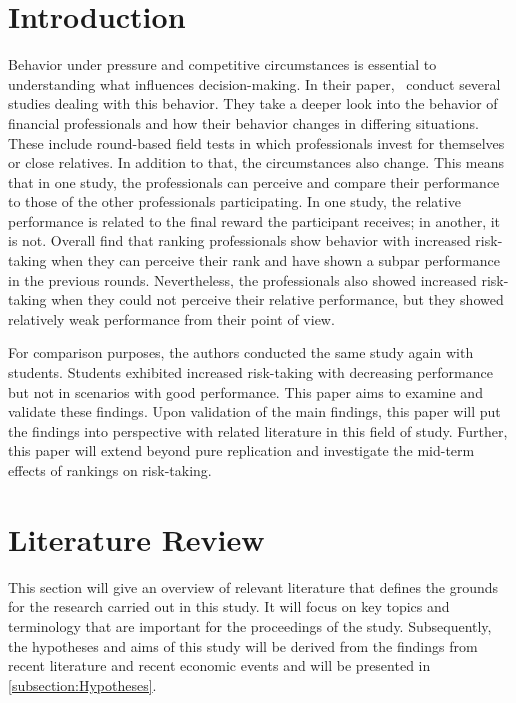 \documentclass[12pt]{article}
\begin{document}
\clearpage
\hypersetup{																		%
    citecolor = blue,
    filecolor = blue,
    linkcolor = blue,
    urlcolor = blue
}

\section{Introduction}
Behavior under pressure and competitive circumstances is essential to understanding what influences decision-making. In their paper, \textcite[p.~2295]{Kirchler2018} conduct several studies dealing with this behavior. They take a deeper look into the behavior of financial professionals and how their behavior changes in differing situations. These include round-based field tests in which professionals invest for themselves or close relatives. In addition to that, the circumstances also change. This means that in one study, the professionals can perceive and compare their performance to those of the other professionals participating. In one study, the relative performance is related to the final reward the participant receives; in another, it is not. Overall \textcite{HAIGH2005} find that ranking professionals show behavior with increased risk-taking when they can perceive their rank and have shown a subpar performance in the previous rounds. Nevertheless, the professionals also showed increased risk-taking when they could not perceive their relative performance, but they showed relatively weak performance from their point of view. \par
For comparison purposes, the authors conducted the same study again with students. Students exhibited increased risk-taking with decreasing performance but not in scenarios with good performance. This paper aims to examine and validate these findings. Upon validation of the main findings, this paper will put the findings into perspective with related literature in this field of study. Further, this paper will extend beyond pure replication and investigate the mid-term effects of rankings on risk-taking.
\par

\section{Literature Review} \label{section:literature_review}
This section will give an overview of relevant literature that defines the grounds for the research carried out in this study. It will focus on key topics and terminology that are important for the proceedings of the study. Subsequently, the hypotheses and aims of this study will be derived from the findings from recent literature and recent economic events and will be presented in \autoref{subsection:Hypotheses}.
\end{document}
